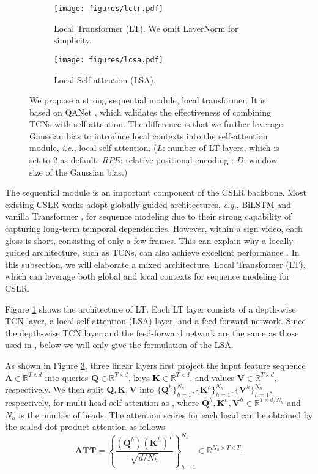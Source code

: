 \documentclass[acmsmall,screen]{acmart}
\def\eg{\emph{e.g.}} \def\Eg{\emph{E.g.}}
\def\ie{\emph{i.e.}} \def\Ie{\emph{I.e.}}
\def \mbf{\mathbf}
\begin{document}
\begin{figure}[t]
\begin{subfigure}[t]{.48\textwidth}
 \centering
 \texttt{[image: figures/lctr.pdf]}
 \caption{Local Transformer (LT). We omit LayerNorm \cite{layernorm} for simplicity.}
 \label{fig:lctr}
\end{subfigure}
\hfill
\begin{subfigure}[t]{.48\textwidth}
  \centering
  \texttt{[image: figures/lcsa.pdf]}
  \caption{Local Self-attention (LSA).}
  \label{fig:lcsa}
\end{subfigure}
\caption{We propose a strong sequential module, local transformer. It is based on QANet \cite{qanet}, which validates the effectiveness of combining TCNs with self-attention. The difference is that we further leverage Gaussian bias \cite{gau-1, gau-2} to introduce local contexts into the self-attention module, \ie, local self-attention. ($L$: number of LT layers, which is set to 2 as default; $RPE$: relative positional encoding \cite{rpe}; $D$: window size of the Gaussian bias.)}
\end{figure}


The sequential module is an important component of the CSLR backbone.
Most existing CSLR works adopt globally-guided architectures, \eg, BiLSTM \cite{iopt, cma} and vanilla Transformer \cite{sfl, slt}, for sequence modeling due to their strong capability of capturing long-term temporal dependencies. 
However, within a sign video, each gloss is short, consisting of only a few frames.
This can explain why a locally-guided architecture, such as TCNs, can also achieve excellent performance \cite{fcn}.
In this subsection, we will elaborate a mixed architecture, Local Transformer (LT), which can leverage both global and local contexts for sequence modeling for CSLR.

Figure \ref{fig:lctr} shows the architecture of LT. 
Each LT layer consists of a depth-wise TCN layer, a local self-attention (LSA) layer, and a feed-forward network. 
Since the depth-wise TCN layer and the feed-forward network are the same as those used in \cite{qanet, transformer}, below we will only give the formulation of the LSA.

As shown in Figure \ref{fig:lcsa}, three linear layers first project the input feature sequence $\mathbf{A} \in \mathbb{R}^{T\times d}$ into queries $\mathbf{Q}\in \mathbb{R}^{T\times d}$, keys $\mathbf{K}\in \mathbb{R}^{T\times d}$, and values $\mathbf{V} \in \mathbb{R}^{T\times d}$, respectively.
We then split $\mbf{Q}, \mbf{K}, \mbf{V}$ into $\{\mbf{Q}^h\}_{h=1}^{N_h}, \{\mbf{K}^h\}_{h=1}^{N_h}, \{\mbf{V}^h\}_{h=1}^{N_h}$, respectively, for multi-head self-attention as \cite{transformer}, where $\mbf{Q}^h, \mbf{K}^h, \mbf{V}^h \in \mathbb{R}^{T\times d/{N_h}}$ and $N_h$ is the number of heads.
The attention scores for each head can be obtained by the scaled dot-product attention as follows:
\begin{equation}
    \mathbf{ATT} = \left\{\frac{(\mbf{Q}^h)(\mbf{K}^{h})^T}{\sqrt{d/N_h}}\right\}_{h=1}^{N_h} \in \mathbb{R}^{N_h\times T\times T}.
\end{equation}
\end{document}
